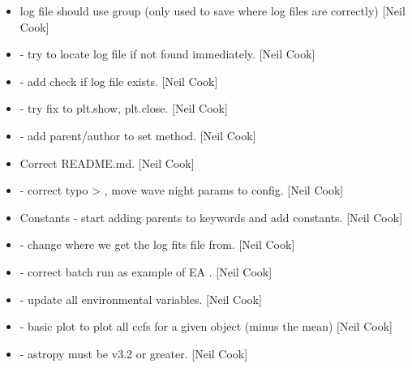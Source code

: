 \documentclass[a4paper,10pt,english]{report}
\begin{document}
\begin{itemize}
\item {} 
 log file should use group (only used to save where log
files are correctly) {[}Neil Cook{]}

\item {} 
 - try to locate log file if not
found immediately. {[}Neil Cook{]}

\item {} 
 - add check if log file exists.
{[}Neil Cook{]}

\item {} 
 - try fix to plt.show, plt.close. {[}Neil Cook{]}

\item {} 
 - add parent/author to set
method. {[}Neil Cook{]}

\item {} 
Correct README.md. {[}Neil Cook{]}

\item {} 
 - correct typo  \textendash{}\textgreater{} , move
wave night params to config. {[}Neil Cook{]}

\item {} 
Constants - start adding parents to keywords and add 
constants. {[}Neil Cook{]}

\item {} 
 - change where we get the log
fits file from. {[}Neil Cook{]}

\item {} 
 - correct batch run as example of
EA . {[}Neil Cook{]}

\item {} 
 - update all environmental variables. {[}Neil
Cook{]}

\item {} 
 - basic plot to plot all ccfs for a given
object (minus the mean) {[}Neil Cook{]}

\item {} 
 - astropy must be v3.2 or greater. {[}Neil Cook{]}


\end{itemize}
\end{document}
